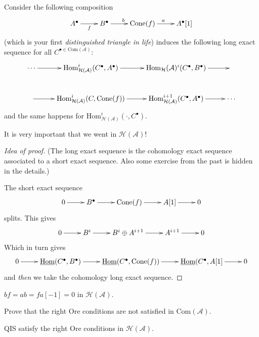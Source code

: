 \begin{lemma}
\label{lemma-cone-long-exact-sequence}
Consider the following composition
$$
\xymatrix{
A^\bullet\ar[r]_f&  B^{\bullet}\ar[r]^b&  \text{Cone}(f)\ar[r]^a &
A^{\bullet}[1]
}
$$
(which is your first {\it distinguished triangle in life}) induces the following
long exact sequence for all $C^{\bullet \in \text{Com}(\mathcal{A})}$:
$$
\xymatrix{
\cdots\ar[r]
&\text{Hom}^i_{\mathcal{H}(\mathcal{A})}(C^{\bullet},A^{\bullet})\ar[r]
&\text{Hom}_{\mathcal{H}}(\mathcal{A})^i(C^{\bullet},B^{\bullet})\ar[r]&\\
\ar[r]&\text{Hom}^i_{\mathcal{H}(\mathcal{A})}(C,\text{Cone}(f))\ar[r]
&\text{Hom}^{i+1}_{\mathcal{H}(\mathcal{A})}(C^{\bullet},A^{\bullet})\ar[r]
&\cdots
}
$$
and the same happens for
$\text{Hom}^i_{\mathcal{H}(\mathcal{A})}(\cdot,C^{\bullet})$.
\end{lemma}

It is very important that we went in $\mathcal{H}(\mathcal{A})$!

\begin{proof}[Idea of proof]
(The long exact sequence is the cohomology exact sequence associated
to a short exact sequence. Also some exercise from the past is hidden in the
details.)

The short exact sequence
$$
\xymatrix{
0\ar[r]&B^{\bullet}\ar[r]&\text{Cone}(f)\ar[r]&A[1]\ar[r]&0
}
$$
splits. This gives
$$
\xymatrix{
0\ar[r]&B^i\ar[r]&B^i\oplus A^{i+1}\ar[r]&A^{i+1}\ar[r]&0
}
$$
Which in turn gives
$$
\xymatrix{
0\ar[r]&\underline{\text{Hom}}(C^{\bullet},B^{\bullet})
\ar[r]&\underline{\text{Hom}}(C^{\bullet},\text{Cone}(f))
\ar[r]&\underline{\text{Hom}}(C^{\bullet},A[1]\ar[r]&0
}
$$
and {\it then} we take the cohomology long exact sequence.
\end{proof}

\begin{exercise}
\label{exercise-simple}
$bf=ab=fa[-1]=0$ in $\mathcal{H}(\mathcal{A})$.
\end{exercise}

\begin{exercise}
\label{exercise-right-Ore-conditions-not-in-Com}
Prove that the right Ore conditions are not satisfied in
$\text{Com}(\mathcal{A})$.
\end{exercise}

\begin{proposition}
\label{proposition-QIS-satisfy-right-Ore-conditions-in-homotopy-category}
QIS satisfy the right Ore conditions in $\mathcal{H}(\mathcal{A})$.
\end{proposition}

